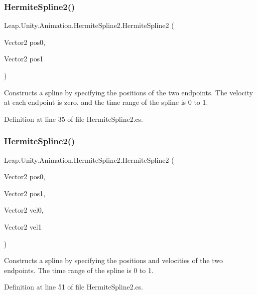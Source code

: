\subsubsection{\texorpdfstring{HermiteSpline2()}{HermiteSpline2()}\hspace{0.1cm}{\footnotesize\ttfamily [1/4]}}
{\footnotesize\ttfamily Leap.\+Unity.\+Animation.\+Hermite\+Spline2.\+Hermite\+Spline2 (\begin{DoxyParamCaption}\item[{Vector2}]{pos0,  }\item[{Vector2}]{pos1 }\end{DoxyParamCaption})}



Constructs a spline by specifying the positions of the two endpoints. The velocity at each endpoint is zero, and the time range of the spline is 0 to 1. 



Definition at line 35 of file Hermite\+Spline2.\+cs.

\mbox{\label{struct_leap_1_1_unity_1_1_animation_1_1_hermite_spline2_abd39b804bfee316f451049c8617a8594}} 
\subsubsection{\texorpdfstring{HermiteSpline2()}{HermiteSpline2()}\hspace{0.1cm}{\footnotesize\ttfamily [2/4]}}
{\footnotesize\ttfamily Leap.\+Unity.\+Animation.\+Hermite\+Spline2.\+Hermite\+Spline2 (\begin{DoxyParamCaption}\item[{Vector2}]{pos0,  }\item[{Vector2}]{pos1,  }\item[{Vector2}]{vel0,  }\item[{Vector2}]{vel1 }\end{DoxyParamCaption})}



Constructs a spline by specifying the positions and velocities of the two endpoints. The time range of the spline is 0 to 1. 



Definition at line 51 of file Hermite\+Spline2.\+cs.

